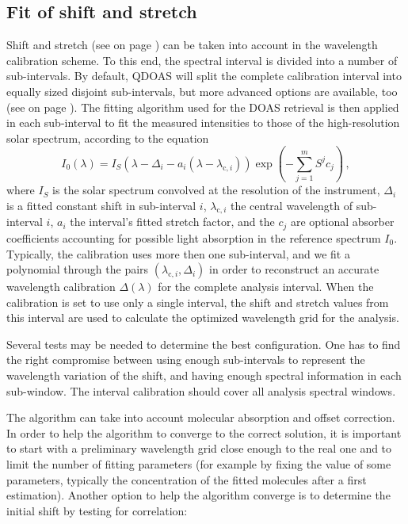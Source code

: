 \subsection{Fit of shift and stretch}\label{sec:fit-shift-stretch}
Shift and stretch (see  on page
\pageref{sec:shift}) can be taken into account in the wavelength
calibration scheme. To this end, the spectral interval is divided into
a number of sub-intervals.  By default, QDOAS will split the complete
calibration interval into equally sized disjoint sub-intervals, but
more advanced options are available, too (see
 on page
\pageref{sec:calibration-windows}).  The fitting algorithm used for
the DOAS retrieval is then applied in each sub-interval to fit the
measured intensities to those of the high-resolution solar spectrum,
according to the equation
\begin{equation}
  \label{eq:calibration_shift}
  I_0(\lambda)= I_S(\lambda - \Delta_i - a_i(\lambda-\lambda_{\mathrm{c},i}))\exp(-\sum_{j=1}^mS^jc_j)\,,
\end{equation}
where $I_S$ is the solar spectrum convolved at the resolution of the
instrument, $\Delta_i$ is a fitted constant shift in sub-interval $i$,
$\lambda_{\mathrm{c},i}$ the central wavelength of sub-interval $i$,
$a_i$ the interval's fitted stretch factor, and the $c_j$ are optional
absorber coefficients accounting for possible light absorption in the
reference spectrum $I_0$.  Typically, the calibration uses more then
one sub-interval, and we fit a polynomial through the pairs
$(\lambda_{\mathrm{c},i}, \Delta_i)$ in order to reconstruct an
accurate wavelength calibration $\Delta(\lambda)$ for the complete
analysis interval.  When the calibration is set to use only a single
interval, the shift and stretch values from this interval are used to
calculate the optimized wavelength grid for the analysis.

Several tests may be needed to determine the best configuration. One
has to find the right compromise between using enough sub-intervals to
represent the wavelength variation of the shift, and having enough
spectral information in each sub-window.  The interval calibration
should cover all analysis spectral windows.

The algorithm can take into account molecular absorption and offset
correction.  In order to help the algorithm to converge to the correct
solution, it is important to start with a preliminary wavelength grid
close enough to the real one and to limit the number of fitting
parameters (for example by fixing the value of some parameters,
typically the concentration of the fitted molecules after a first
estimation).  Another option to help the algorithm converge is to
determine the initial shift by testing for correlation:

